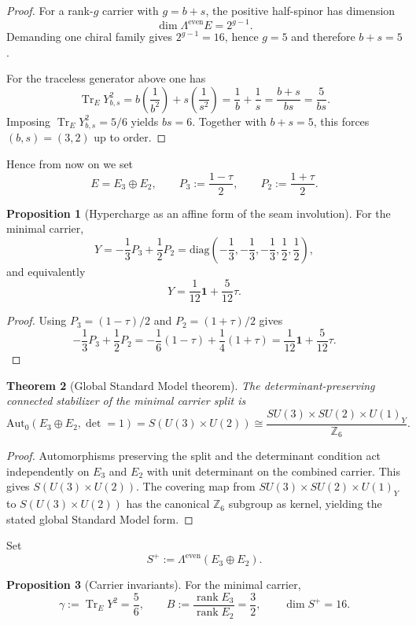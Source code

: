 \documentclass[11pt,a4paper]{article}
\newtheorem{theorem}{Theorem}[section]
\theoremstyle{definition}
\newtheorem{proposition}[theorem]{Proposition}
\theoremstyle{remark}
\newcommand{\tr}{\operatorname{Tr}}
\newcommand{\rank}{\operatorname{rank}}
\begin{document}
\begin{proof}
For a rank-$g$ carrier with $g=b+s$, the positive half-spinor has dimension
\[
\dim \Lambda^{\mathrm{even}}E = 2^{g-1}.
\]
Demanding one chiral family gives $2^{g-1}=16$, hence $g=5$ and therefore $b+s=5$.

For the traceless generator above one has
\[
\tr_E Y_{b,s}^2 = b\left(\frac{1}{b^2}\right)+s\left(\frac{1}{s^2}\right)
= \frac1b+\frac1s
= \frac{b+s}{bs}
= \frac{5}{bs}.
\]
Imposing $\tr_EY_{b,s}^2=5/6$ yields $bs=6$. Together with $b+s=5$, this forces $(b,s)=(3,2)$ up to order.
\end{proof}

Hence from now on we set
\[
E=E_3\oplus E_2,
\qquad
P_3:=\frac{1-\tau}{2},
\qquad
P_2:=\frac{1+\tau}{2}.
\]

\begin{proposition}[Hypercharge as an affine form of the seam involution]
For the minimal carrier,
\[
Y=-\frac13 P_3+\frac12 P_2
=\mathrm{diag}\!\left(-\frac13,-\frac13,-\frac13,\frac12,\frac12\right),
\]
and equivalently
\[
Y=\frac{1}{12}\mathbf 1+\frac{5}{12}\tau.
\]
\end{proposition}

\begin{proof}
Using $P_3=(1-\tau)/2$ and $P_2=(1+\tau)/2$ gives
\[
-\frac13 P_3+\frac12 P_2
= -\frac16(1-\tau)+\frac14(1+\tau)
= \frac{1}{12}\mathbf 1+\frac{5}{12}\tau.
\]
\end{proof}

\begin{theorem}[Global Standard Model theorem]
The determinant-preserving connected stabilizer of the minimal carrier split is
\[
\mathrm{Aut}_0(E_3\oplus E_2,\det=1)
= S(U(3)\times U(2))
\cong \frac{SU(3)\times SU(2)\times U(1)_Y}{\mathbb Z_6}.
\]
\end{theorem}

\begin{proof}
Automorphisms preserving the split and the determinant condition act independently on $E_3$ and $E_2$ with unit determinant on the combined carrier. This gives $S(U(3)\times U(2))$. The covering map from $SU(3)\times SU(2)\times U(1)_Y$ to $S(U(3)\times U(2))$ has the canonical $\mathbb Z_6$ subgroup as kernel, yielding the stated global Standard Model form.
\end{proof}

Set
\[
S^+ := \Lambda^{\mathrm{even}}(E_3\oplus E_2).
\]

\begin{proposition}[Carrier invariants]
For the minimal carrier,
\[
\gamma := \tr_EY^2 = \frac56,
\qquad
B := \frac{\rank E_3}{\rank E_2} = \frac32,
\qquad
\dim S^+ = 16.
\]
\end{proposition}
\end{document}

